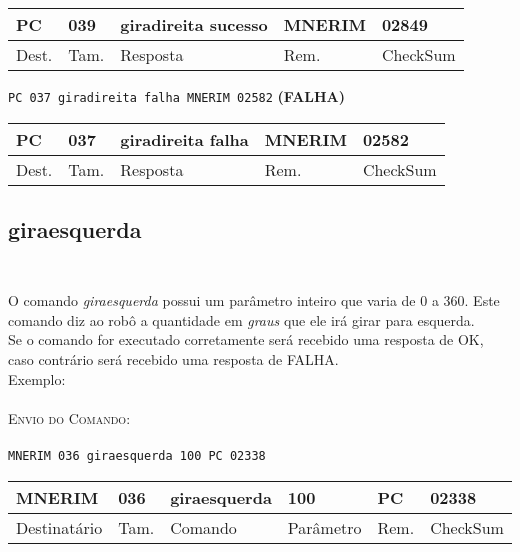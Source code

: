 \documentclass[11pt,	 papera4]{article}
\begin{document}
\begin{table}[h]
	\centering
	\begin{tabular}{p{1cm}p{1cm}p{3.3cm}p{2cm}p{2cm}}
		\toprule
		PC & 039 &giradireita sucesso  & MNERIM & 02849 \\
		\midrule	
		Dest. & Tam. & Resposta & Rem. & CheckSum \\
		\bottomrule
	\end{tabular}
	\label{tab:formatoslatex} %
\end{table}

\hspace*{1.2cm} \texttt{PC 037 giradireita falha MNERIM 02582} \hspace*{2.5cm}\textbf{(FALHA)}

\begin{table}[h]
	\centering
	\begin{tabular}{p{1cm}p{1cm}p{3cm}p{2cm}p{2cm}}
		\toprule
		PC & 037 &giradireita falha  & MNERIM & 02582 \\
		\midrule	
		Dest. & Tam. & Resposta & Rem. & CheckSum \\
		\bottomrule
	\end{tabular}
	\label{tab:formatoslatex} %
\end{table}


\newpage

\subsection*{giraesquerda \\\\}
O comando \textit{giraesquerda} possui um parâmetro inteiro que varia de 0 a 360.
Este comando diz ao robô a quantidade em \textit{graus} que ele irá girar para esquerda.\\
Se o comando for executado corretamente será recebido uma resposta de OK, caso contrário será recebido uma resposta de FALHA. \\
\newline
Exemplo:\\\\ \hspace*{0.5cm} 
\textsc{Envio do Comando:} \\\\ \hspace*{2cm} \texttt{MNERIM 036 giraesquerda 100 PC 02338} \\

\begin{table}[h]
	\centering
	\begin{tabular}{p{2cm}p{1cm}p{2cm}p{2cm}p{1cm}p{2cm}}
		\toprule
		MNERIM & 036 & giraesquerda & 100 & PC & 02338 \\
		\midrule	
		Destinatário & Tam. & Comando & Parâmetro & Rem. & CheckSum \\
		\bottomrule
	\end{tabular}
	\label{tab:formatoslatex} %
\end{table}
\end{document}
